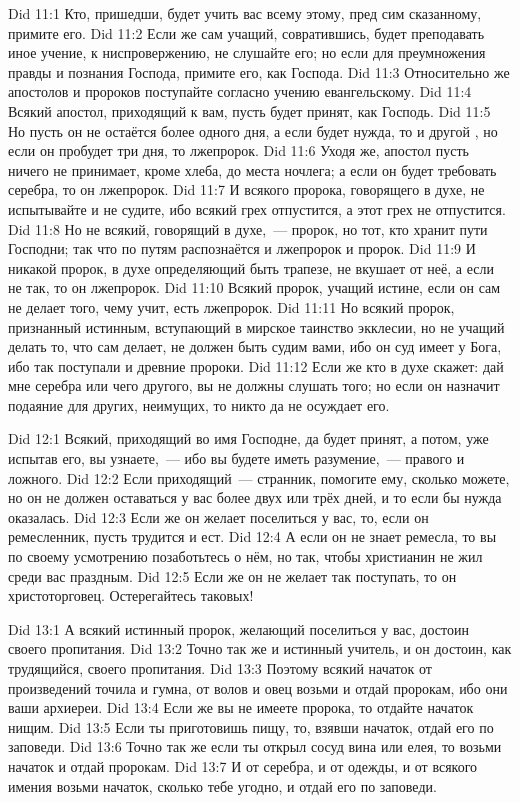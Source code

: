 \vs Did 11:1
Кто, пришедши, будет учить вас всему этому,
пред сим сказанному, примите его.
\vs Did 11:2
Если же сам учащий, совратившись, будет преподавать иное
учение, к ниспровержению, не слушайте его; но если для
преумножения правды и познания Господа, примите его, как Господа.
\vs Did 11:3
Относительно же апостолов и пророков поступайте
согласно учению евангельскому.
\vs Did 11:4
Всякий апостол, приходящий к вам, пусть будет принят, как Господь.
\vs Did 11:5
Но пусть он не остаётся более одного дня, а если будет нужда,
то и другой , но если он пробудет три дня, то лжепророк.
\vs Did 11:6
Уходя же, апостол пусть ничего не принимает, кроме хлеба,
до  места ночлега;
а если он будет требовать серебра, то он лжепророк.
\vs Did 11:7
И всякого пророка, говорящего в духе, не испытывайте и не
судите, ибо всякий грех отпустится,
а этот грех не отпустится.
\vs Did 11:8
Но не всякий, говорящий в духе,~--- пророк,
но  тот, кто хранит пути Господни;
так что по путям распознаётся и лжепророк и пророк.
\vs Did 11:9
И никакой пророк, в духе определяющий быть трапезе,
не вкушает от неё, а если не так, то он лжепророк.
\vs Did 11:10
Всякий пророк, учащий истине, если он сам не делает того, чему
учит, есть лжепророк.
\vs Did 11:11
Но всякий пророк, признанный истинным, вступающий в мирское
таинство экклесии, но не учащий делать то, что сам делает,
не должен быть судим вами, ибо он суд имеет у Бога,
ибо так поступали и древние пророки.
\vs Did 11:12
Если же кто в духе скажет: дай мне серебра или чего другого,
вы не должны слушать того; но если он назначит подаяние для других, неимущих,
то никто да не осуждает его.

\vs Did 12:1
Всякий, приходящий во имя Господне, да будет принят, а потом,
уже испытав его,
вы узнаете,~--- ибо вы будете иметь разумение,~--- правого и ложного.
\vs Did 12:2
Если приходящий~--- странник, помогите ему, сколько можете,
но он не должен оставаться у вас более двух или трёх дней,
и то если бы нужда оказалась.
\vs Did 12:3
Если же он желает поселиться у вас, то, если он ремесленник,
пусть трудится и ест.
\vs Did 12:4
А если он не знает ремесла, то вы по своему усмотрению
позаботьтесь о нём, но так, чтобы христианин не жил среди вас праздным.
\vs Did 12:5
Если же он не желает так поступать, то он христоторговец.
Остерегайтесь таковых!

\vs Did 13:1
А всякий истинный пророк, желающий поселиться у вас,
достоин своего пропитания.
\vs Did 13:2
Точно так же и истинный учитель, и он достоин, как трудящийся,
своего пропитания.
\vs Did 13:3
Поэтому всякий начаток от произведений точила и гумна, от волов
и овец возьми и отдай пророкам, ибо они ваши архиереи.
\vs Did 13:4
Если же вы не имеете пророка, то отдайте начаток нищим.
\vs Did 13:5
Если ты приготовишь пищу, то, взявши начаток, отдай его по
заповеди.
\vs Did 13:6
Точно так же если ты открыл сосуд вина или елея, то возьми
начаток и отдай пророкам.
\vs Did 13:7
И от серебра, и от одежды, и от всякого имения возьми начаток,
сколько тебе угодно, и отдай его по заповеди.

